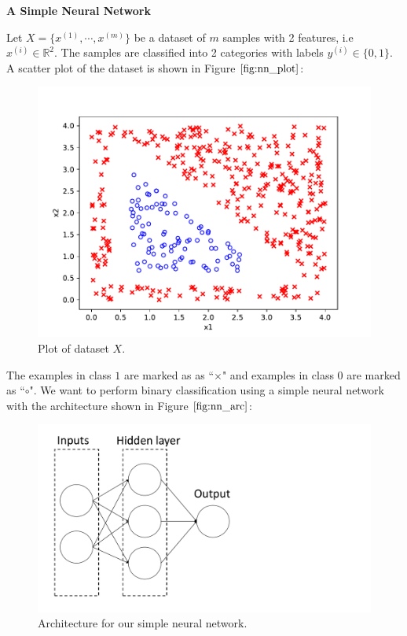 \clearpage
\item {} {\bf A Simple Neural Network}

Let $X = \{x^{(1)}, \cdots, x^{(m)}\}$ be a dataset of $m$ samples with 2 features, i.e $x^{(i)} \in \mathbb{R}^2$. The samples are classified into 2 categories with labels $ y^{(i)} \in \{0, 1\}$. A scatter plot of the dataset is shown in Figure $\ref{fig:nn_plot}$:
	\begin{figure}[htbp] 
		\centering
		\includegraphics[scale=0.5]{../data/nn_plot.pdf}
		\caption{Plot of dataset $X$.}
		\label{fig:nn_plot}
	\end{figure}

	The examples in class $1$ are marked as as ``$\times$" and examples in class $0$ are marked as ``$\circ$". We want to perform binary classification using a simple neural network with the architecture shown in Figure $\ref{fig:nn_arc}$:
	\begin{figure}[htbp]
		\centering
		\includegraphics[scale=0.2, trim = 0 0 360 0, clip]{../data/nn_architecture.pdf}
		\caption{Architecture for our simple neural network.}
		 \label{fig:nn_arc}
	\end{figure}

